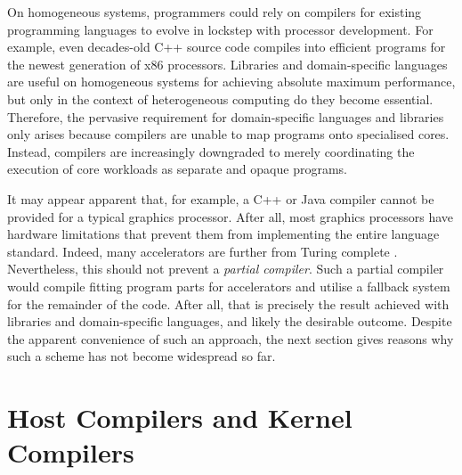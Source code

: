     On homogeneous systems, programmers could rely on compilers for existing
    programming languages to evolve in lockstep with processor development.
    For example, even decades-old C++ source code compiles into efficient
    programs for the newest generation of x86 processors.
    Libraries and domain-specific languages are useful on homogeneous systems
    for achieving absolute maximum performance, but only in the context of
    heterogeneous computing do they become essential.
    Therefore, the pervasive requirement for domain-specific languages and
    libraries only arises because compilers are unable to map programs onto
    specialised cores.
    Instead, compilers are increasingly downgraded to merely coordinating the
    execution of core workloads as separate and opaque programs.

    It may appear apparent that, for example, a C++ or Java compiler cannot
    be provided for a typical graphics processor.
    After all, most graphics processors have hardware limitations that prevent
    them from implementing the entire language standard.
    Indeed, many accelerators are further from Turing complete
    \citep{jouppi2017datacenter}.
    Nevertheless, this should not prevent a {\it partial compiler}.
    Such a partial compiler would compile fitting program parts for accelerators
    and utilise a fallback system for the remainder of the code.
    After all, that is precisely the result achieved with libraries and
    domain-specific languages, and likely the desirable outcome.
    Despite the apparent convenience of such an approach, the next section gives
    reasons why such a scheme has not become widespread so far.

\section{Host Compilers and Kernel Compilers}
\label{sec:hostkernel}

